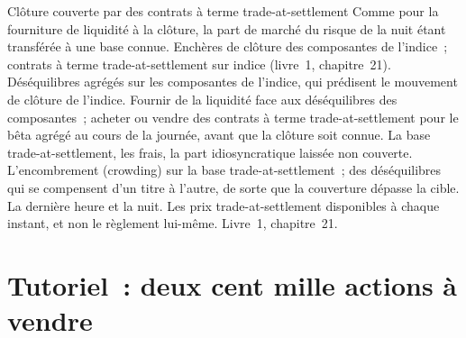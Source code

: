\begin{strategyfile}{Clôture couverte par des contrats à terme trade-at-settlement}\label{strat:hf:auctions-and-the-close:tas}
 Comme pour la fourniture de liquidité à la clôture, la part de marché du risque de la nuit étant transférée à une base connue.
 Enchères de clôture des composantes de l'indice~; contrats à terme trade-at-settlement sur indice (livre~1, chapitre~21).
 Déséquilibres agrégés sur les composantes de l'indice, qui prédisent le mouvement de clôture de l'indice.
 Fournir de la liquidité face aux déséquilibres des composantes~; acheter ou vendre des contrats à terme trade-at-settlement pour le bêta agrégé au cours de la
journée, avant que la clôture soit connue.
 La base trade-at-settlement, les frais, la part idiosyncratique laissée non couverte.
 L'encombrement (crowding) sur la base trade-at-settlement~; des déséquilibres qui se compensent d'un titre à l'autre, de sorte que la couverture dépasse la cible.
 La dernière heure et la nuit.
 Les prix trade-at-settlement disponibles à chaque instant, et non le règlement lui-même.
 Livre~1, chapitre~21.
\end{strategyfile}

\section{Tutoriel~: deux cent mille actions à vendre}\label{tut:hf:auctions-and-the-close:tut}

